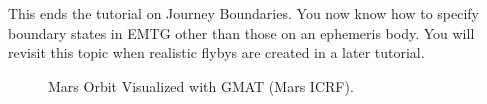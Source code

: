 \documentclass[11pt]{article}
\begin{document}
\noindent This ends the tutorial on Journey Boundaries. You now know how to specify boundary states in \ac{EMTG} other than those on an ephemeris body. You will revisit this topic when realistic flybys are created in a later tutorial.

\begin{figure}[H]
	\centering
	\caption{\label{fig:orbit_in_GMAT}Mars Orbit Visualized with \ac{GMAT} (Mars \acs{ICRF}).}
\end{figure}
\end{document}
